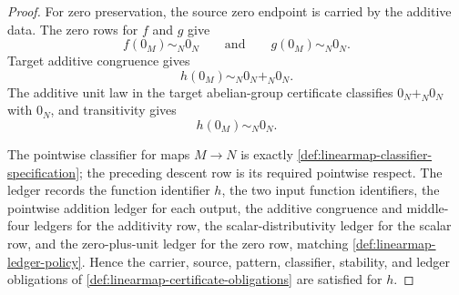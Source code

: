 \begin{proof}
For zero preservation, the source zero endpoint is carried by the additive data. The zero rows for $f$ and $g$ give
$$
f(0_M)\sim_N0_N
\qquad\text{and}\qquad
g(0_M)\sim_N0_N.
$$
Target additive congruence gives
$$
h(0_M)\sim_N0_N+_N0_N.
$$
The additive unit law in the target abelian-group certificate classifies $0_N+_N0_N$ with $0_N$, and transitivity gives
$$
h(0_M)\sim_N0_N.
$$

The pointwise classifier for maps $M\to N$ is exactly \autoref{def:linearmap-classifier-specification}; the preceding descent row is its required pointwise respect. The ledger records the function identifier $h$, the two input function identifiers, the pointwise addition ledger for each output, the additive congruence and middle-four ledgers for the additivity row, the scalar-distributivity ledger for the scalar row, and the zero-plus-unit ledger for the zero row, matching \autoref{def:linearmap-ledger-policy}. Hence the carrier, source, pattern, classifier, stability, and ledger obligations of \autoref{def:linearmap-certificate-obligations} are satisfied for $h$.
\end{proof}

